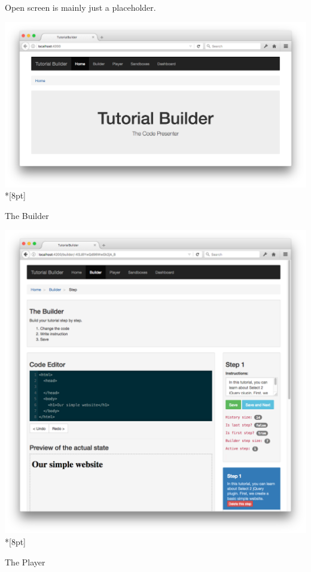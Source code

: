 \documentclass[12pt, a4paper, oneside, openright, medskipamount]{report}
\begin{document}
Open screen is mainly just a placeholder.

\includegraphics[width=1\textwidth]{assets/tour-screenshots/home-page.png}\\*[8pt]

The Builder

\includegraphics[width=1\textwidth]{assets/tour-screenshots/the-builder.png}\\*[8pt]

The Player
\end{document}
